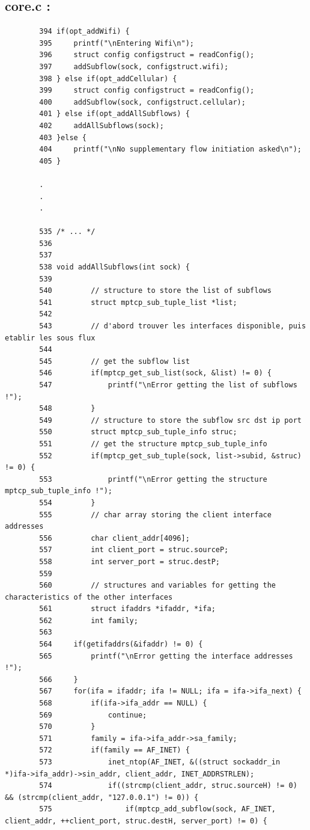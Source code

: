 \documentclass[a4paper,11pt]{article}
\begin{document}
		\subsection{core.c :}
	 	\label{subsec:core.c}
	 	\begin{lstlisting}
		394	if(opt_addWifi) {
		395		printf("\nEntering Wifi\n");
		396		struct config configstruct = readConfig();
		397		addSubflow(sock, configstruct.wifi);
	    398	} else if(opt_addCellular) {
		399		struct config configstruct = readConfig();
		400		addSubflow(sock, configstruct.cellular);
	    401	} else if(opt_addAllSubflows) {
		402		addAllSubflows(sock);
	    403	}else {
		404		printf("\nNo supplementary flow initiation asked\n");
		405	}

		.
		.
		.

		535	/* ... */
		536
		537
		538	void addAllSubflows(int sock) { 
		539	     
		540	        // structure to store the list of subflows
		541	        struct mptcp_sub_tuple_list *list;
		542	    
		543	        // d'abord trouver les interfaces disponible, puis etablir les sous flux
		544	    
		545	        // get the subflow list 
		546	        if(mptcp_get_sub_list(sock, &list) != 0) {
		547	            printf("\nError getting the list of subflows !");
		548	        }
		549	        // structure to store the subflow src dst ip port
		550	        struct mptcp_sub_tuple_info struc;
		551	        // get the structure mptcp_sub_tuple_info
		552	        if(mptcp_get_sub_tuple(sock, list->subid, &struc) != 0) {
		553	            printf("\nError getting the structure mptcp_sub_tuple_info !");
		554	        }
		555	        // char array storing the client interface addresses
		556	        char client_addr[4096];
		557	        int client_port = struc.sourceP;
		558	        int server_port = struc.destP;
		559	        
		560	        // structures and variables for getting the characteristics of the other interfaces
		561	        struct ifaddrs *ifaddr, *ifa;
		562	        int family;
		563
		564		if(getifaddrs(&ifaddr) != 0) {
		565			printf("\nError getting the interface addresses !");
		566		}
		567		for(ifa = ifaddr; ifa != NULL; ifa = ifa->ifa_next) {
		568			if(ifa->ifa_addr == NULL) {
		569				continue;
		570			}
		571			family = ifa->ifa_addr->sa_family;
		572			if(family == AF_INET) {
		573				inet_ntop(AF_INET, &((struct sockaddr_in *)ifa->ifa_addr)->sin_addr, client_addr, INET_ADDRSTRLEN);
		574				if((strcmp(client_addr, struc.sourceH) != 0) && (strcmp(client_addr, "127.0.0.1") != 0)) {
		575					if(mptcp_add_subflow(sock, AF_INET, client_addr, ++client_port, struc.destH, server_port) != 0) {

\end{lstlisting}
\end{document}
